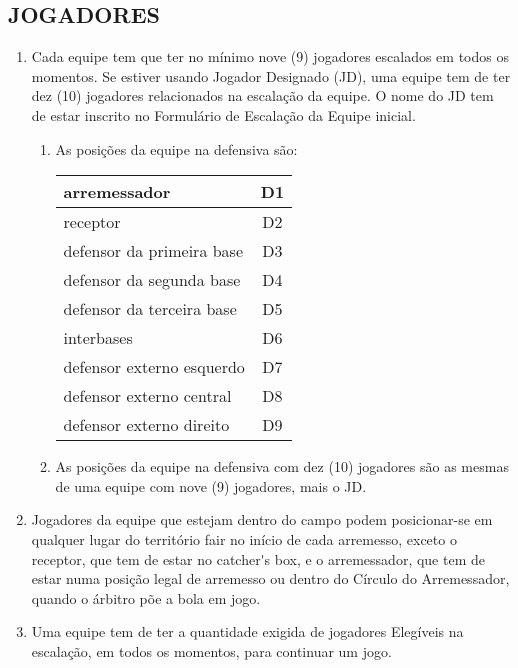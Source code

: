 \subsection{JOGADORES}
\begin{enumerate}[label=(\alph*)]\item   Cada equipe tem que ter no mínimo nove (9) jogadores escalados em todos
 os momentos. Se estiver usando Jogador Designado (JD), uma equipe tem de
 ter dez (10) jogadores relacionados na escalação da equipe. O nome do JD tem
 de estar inscrito no Formulário de Escalação da Equipe inicial.
  \begin{enumerate}[label=\roman*.]
	\item As posições da equipe na defensiva são:
		\begin{tabular}{l|c}\hline
			arremessador & D1	\\\hline
			receptor &D2\\\hline
			defensor da primeira base &  D3\\\hline
			defensor da segunda base & D4\\\hline
			defensor da  terceira base &  D5\\\hline
			interbases & D6\\\hline
			defensor externo esquerdo & D7\\\hline
			defensor externo central & D8\\\hline
			defensor externo direito & D9\\\hline
	\end{tabular}
\item  As posições da equipe na defensiva com dez (10) jogadores são as mesmas
 de uma equipe com nove (9) jogadores, mais o JD.
\end{enumerate}
\item  Jogadores da equipe que estejam dentro do campo podem posicionar-se em
 qualquer lugar do território \gls{fair} no início de cada arremesso, exceto o receptor,
 que tem de estar no \gls{catcher's box}, e o arremessador, que tem de estar numa
 posição legal de arremesso ou dentro do Círculo do Arremessador, quando o árbitro põe a bola em jogo.
\item  Uma equipe tem de ter a quantidade exigida de jogadores Elegíveis na
 escalação, em todos os momentos, para continuar um jogo.
\end{enumerate}
